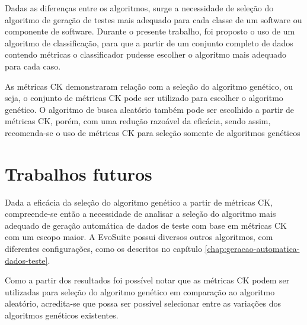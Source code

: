 \documentclass[
	12pt,				%
	oneside,			%
	a4paper,			%
	english,			%
	brazil				%
	]{abntex2ppgsi}
\begin{document}
Dadas as diferenças entre os algoritmos, surge a necessidade de seleção do algoritmo  de geração de testes mais adequado para cada classe de um software ou componente de software. Durante o presente trabalho, foi proposto o uso de um algoritmo de classificação, para que a partir de um conjunto completo de dados contendo métricas o classificador pudesse escolher o algoritmo mais adequado para cada caso.

As métricas CK demonstraram relação com a seleção do algoritmo genético, ou seja, o conjunto de métricas CK pode ser utilizado para escolher o algoritmo genético.  O algoritmo de busca aleatório também pode ser escolhido a partir de métricas CK, porém, com uma redução razoável da eficácia, sendo assim, recomenda-se o uso de métricas CK para seleção somente de algoritmos genéticos

\section{Trabalhos futuros}
Dada a eficácia da seleção do algoritmo genético a partir de métricas CK, compreende-se então a necessidade de analisar a seleção do algoritmo mais adequado de geração automática de dados de teste com base em métricas CK com um escopo maior. A EvoSuite possui diversos outros algoritmos, com diferentes configurações, como os descritos no capítulo \ref{chap:geracao-automatica-dados-teste}.

\newpage
Como a partir dos resultados foi possível notar que as métricas CK podem ser utilizadas para seleção do algoritmo genético em comparação ao algoritmo aleatório, acredita-se que possa ser possível selecionar entre as variações dos algoritmos genéticos existentes.


\postextual



%
%

\end{document}
